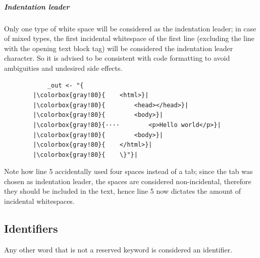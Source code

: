 \subparagraph{Indentation leader} Only one type of white space will be
considered as the indentation leader; in case of mixed types, the first
incidental whitespace of the first line (excluding the line with the opening
text block tag) will be considered the indentation leader character. So it is
advised to be consistent with code formatting to avoid ambiguities and
undesired side effects.


\begin{verbatim}
			_out <- "{
		|\colorbox{gray!80}{	<html>}|
		|\colorbox{gray!80}{		<head></head>}|
		|\colorbox{gray!80}{		<body>}|
		|\colorbox{gray!80}{····		<p>Hello world</p>}|
		|\colorbox{gray!80}{		<body>}|
		|\colorbox{gray!80}{	</html>}|
		|\colorbox{gray!80}{	\}"}|
\end{verbatim}

Note how line 5 accidentally used four spaces instead of a tab; since the tab
was chosen as indentation leader, the spaces are considered non-incidental,
therefore they should be included in the text, hence line 5 now dictates the
amount of incidental whitespaces.

\subsection{Identifiers}

Any other word that is not a reserved keyword is considered an identifier.


